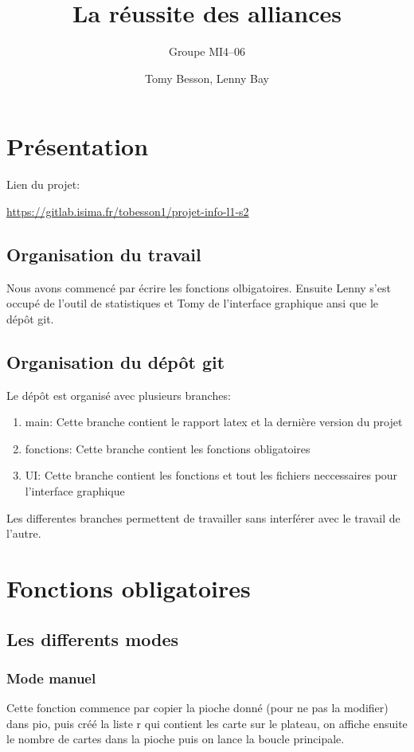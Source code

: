 \documentclass{scrartcl}
\title{La réussite des alliances}
\subtitle{Groupe MI4--06}
\author{Tomy Besson, Lenny Bay}
\newcommand{\ts}[1]{{\fontfamily{pcr}\selectfont #1}}
\begin{document}
\sffamily
\maketitle

\tableofcontents

\thispagestyle{empty}
\clearpage
\setcounter{page}{1}


\section{Présentation}
Lien du projet:  
 
\url{https://gitlab.isima.fr/tobesson1/projet-info-l1-s2}

\subsection{Organisation du travail}
Nous avons commencé par écrire les fonctions olbigatoires.
Ensuite Lenny s'est occupé de l'outil de statistiques et Tomy de l'interface graphique ansi que le dépôt git.

\subsection{Organisation du dépôt git}
Le dépôt est organisé avec plusieurs branches:
\begin{enumerate}
    \item \ts{main}: Cette branche contient le rapport latex et la dernière version du projet
    \item \ts{fonctions}: Cette branche contient les fonctions obligatoires
    \item \ts{UI}: Cette branche contient les fonctions et tout les fichiers neccessaires pour l'interface graphique
\end{enumerate}
Les differentes branches permettent de travailler sans interférer avec le travail de l'autre.

\section{Fonctions obligatoires}

\subsection{Les differents modes}
\subsubsection{Mode manuel}\label{subsec:mode_m}
Cette fonction commence par copier la pioche donné (pour ne pas la modifier) dans \ts{pio}, puis créé la liste \ts{r} qui contient les carte sur le plateau, on affiche ensuite le nombre de cartes dans la pioche puis on lance la boucle principale.
\end{document}
